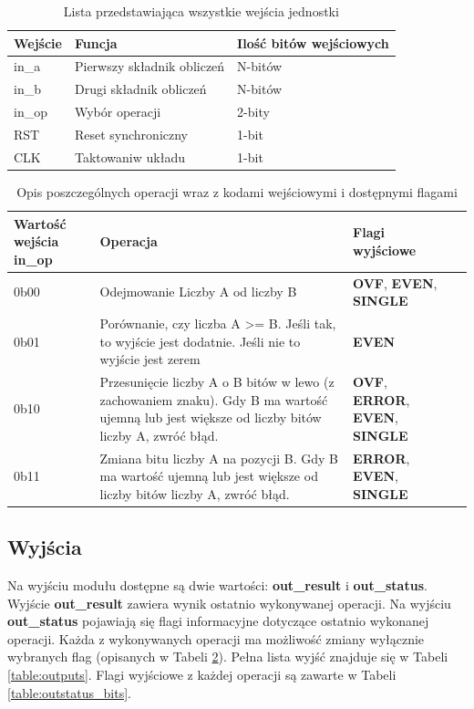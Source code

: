 \documentclass[12pt]{article}
\begin{document}
		\begin{table}[!ht]
		\centering
		\begin{tabular}{|l|l|l|}
			\hline
			\textbf{Wejście} & \textbf{Funcja} & \textbf{Ilość bitów wejściowych} \\ \hline
			in\_a & Pierwszy składnik obliczeń & N-bitów \\ \hline
			in\_b & Drugi składnik obliczeń & N-bitów \\ \hline
			in\_op & Wybór operacji & 2-bity \\ \hline
			RST & Reset synchroniczny & 1-bit \\ \hline
			CLK & Taktowaniw układu & 1-bit \\ \hline
		\end{tabular}
		\caption{Lista przedstawiająca wszystkie wejścia jednostki}
		\label{table:inputs}
	\end{table}
	
	\begin{table}[!ht]
		\centering
		\begin{tabularx}{\linewidth}{|X|X|X|X|}
			\hline
			\textbf{Wartość wejścia in\_op} & \textbf{Operacja} & \textbf{Flagi wyjściowe} \\ \hline
			0b00 & Odejmowanie Liczby A od liczby B & \textbf{OVF}, \textbf{EVEN}, \textbf{SINGLE}\\ \hline
			0b01 & Porównanie, czy liczba \newline A >= B. Jeśli tak, to wyjście jest dodatnie. Jeśli nie to wyjście jest zerem & \textbf{EVEN} \\ \hline
			0b10 & Przesunięcie liczby A o B bitów w lewo (z zachowaniem znaku). Gdy B ma wartość ujemną lub jest większe od liczby bitów liczby A, zwróć błąd. & \textbf{OVF}, \textbf{ERROR}, \textbf{EVEN}, \textbf{SINGLE} \\ \hline
			0b11 & Zmiana bitu liczby A na pozycji B. Gdy B ma wartość ujemną lub jest większe od liczby bitów liczby A, zwróć błąd. & \textbf{ERROR}, \textbf{EVEN}, \textbf{SINGLE} \\ \hline
		\end{tabularx}
		\caption{Opis poszczególnych operacji wraz z kodami wejściowymi i dostępnymi flagami}
		\label{table:inop_values}
	\end{table}

	
	\subsection*{Wyjścia}
	Na wyjściu modułu dostępne są dwie wartości: \textbf{out\_result} i \textbf{out\_status}. Wyjście \textbf{out\_result} zawiera wynik ostatnio wykonywanej operacji. Na wyjściu \textbf{out\_status} pojawiają się flagi informacyjne dotyczące ostatnio wykonanej operacji. Każda z wykonywanych operacji ma możliwość zmiany wyłącznie wybranych flag (opisanych w Tabeli \ref{table:inop_values}). Pełna lista wyjść znajduje się w Tabeli \ref{table:outputs}. Flagi wyjściowe z każdej operacji są zawarte w Tabeli \ref{table:outstatus_bits}. 
	
\end{document}
